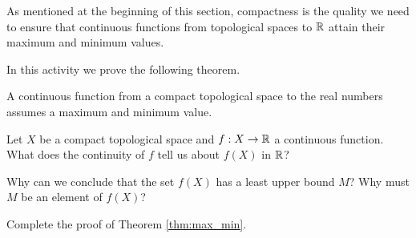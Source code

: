 \begin{comment}

\ActivitySolution Let $M = 1$. For any $a_1, a_2 \in \Z$, we have that $d(a_1,a_2) \leq 1$. So $\Z$ is bounded. Every subset of a metric space with the discrete metric is closed, so $\Z$ is closed.  But $\Z$ is not compact since open cover with no finite sub-cover is $\{\{n\}\}_{n \in \Z}$. 

\end{comment}
 


As mentioned at the beginning of this section, compactness is the quality we need to ensure that continuous functions from topological spaces to $\mathbb{R}$ attain their maximum and minimum values.


\begin{activity} In this activity we prove the following theorem. 

\begin{theorem} \label{thm:max_min} A continuous function from a compact topological space to the real numbers assumes a maximum and minimum value. 
\end{theorem}

\ba
\item Let $X$ be a compact topological space and $f: X \to \mathbb{R}$ a continuous function. What does the continuity of $f$ tell us about $f(X)$ in $\mathbb{R}$? 

\item Why can we conclude that the set $f(X)$ has a least upper bound $M$? Why must $M$ be an element of $f(X)$?

\item Complete the proof of Theorem \ref{thm:max_min}.

\ea

\end{activity}

\begin{comment}

\ActivitySolution

\ba
\item Since $f$ is continuous, we know that $f(X)$ is compact in $\R$ by Activity 16.2. 

\item By the Heine-Borel Theorem, it follows that $f(X)$ is closed and bounded. Since $f(X)$ is bounded, there is a least upper bound $M$ for $f(X)$. Now $M$ is a limit point of $f(X)$ and $f(X)$ is closed, so $M \in f(X)$.

\item Similarly, $f(X)$ contains its greatest lower bound $m$. Thus, $f$ assumes a maximum value $M$ and a minimum value $m$ in $\R$.

\ea


\end{comment}



